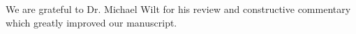 \documentclass[onecolumn, extra, mreferee]{gji}
\begin{document}
We are grateful to Dr. Michael Wilt for his review and constructive commentary which greatly improved our manuscript.


\clearpage




\clearpage





% 

\end{document}
